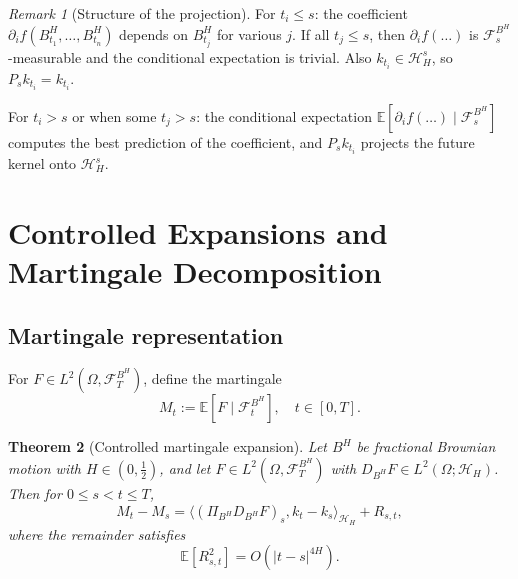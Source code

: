 \documentclass[11pt,a4paper]{article}
\theoremstyle{plain}
\newtheorem{theorem}{Theorem}[section]
\theoremstyle{definition}
\theoremstyle{remark}
\newtheorem{remark}[theorem]{Remark}
\newcommand{\E}{\mathbb{E}}
\newcommand{\ip}[2]{\langle #1, #2 \rangle}
\newcommand{\Lp}[1]{L^{#1}}
\newcommand{\Ft}{\mathcal{F}_t}
\newcommand{\Fs}{\mathcal{F}_s}
\newcommand{\FT}{\mathcal{F}_T}
\newcommand{\HH}{\mathcal{H}_H}
\begin{document}
\begin{remark}[Structure of the projection]\label{rem:proj-structure}
For $t_i \leq s$: the coefficient $\partial_i f(B^H_{t_1}, \ldots, B^H_{t_n})$ depends on $B^H_{t_j}$ for various $j$. If all $t_j \leq s$, then $\partial_i f(\ldots)$ is $\Fs^{B^H}$-measurable and the conditional expectation is trivial. Also $k_{t_i} \in \HH^s$, so $P_s k_{t_i} = k_{t_i}$.

For $t_i > s$ or when some $t_j > s$: the conditional expectation $\E[\partial_i f(\ldots) \mid \Fs^{B^H}]$ computes the best prediction of the coefficient, and $P_s k_{t_i}$ projects the future kernel onto $\HH^s$.
\end{remark}

\section{Controlled Expansions and Martingale Decomposition}\label{sec:controlled}

\subsection{Martingale representation}

For $F \in \Lp{2}(\Omega, \FT^{B^H})$, define the martingale
\[
M_t := \E[F \mid \Ft^{B^H}], \quad t \in [0, T].
\]

\begin{theorem}[Controlled martingale expansion]\label{thm:controlled-expansion}
Let $B^H$ be fractional Brownian motion with $H \in (0, \frac{1}{2})$, and let $F \in \Lp{2}(\Omega, \FT^{B^H})$ with $D_{B^H} F \in \Lp{2}(\Omega; \HH)$. Then for $0 \leq s < t \leq T$,
\begin{equation}\label{eq:controlled-expansion}
M_t - M_s = \ip{(\Pi_{B^H} D_{B^H} F)_s}{k_t - k_s}_{\HH} + R_{s,t},
\end{equation}
where the remainder satisfies
\begin{equation}\label{eq:remainder-bound}
\E[R_{s,t}^2] = O(|t - s|^{4H}).
\end{equation}
\end{theorem}
\end{document}
